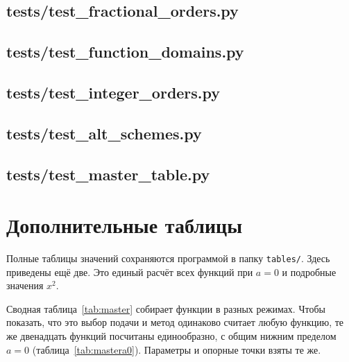 \documentclass[14pt,a4paper]{extarticle}
\begin{document}
\subsection{tests/test\_fractional\_orders.py}


\subsection{tests/test\_function\_domains.py}


\subsection{tests/test\_integer\_orders.py}


\subsection{tests/test\_alt\_schemes.py}


\subsection{tests/test\_master\_table.py}


\section{Дополнительные таблицы}

Полные таблицы значений сохраняются программой в папку \texttt{tables/}. Здесь приведены ещё две. Это единый расчёт всех функций при $a=0$ и подробные значения $x^2$.

Сводная таблица~\ref{tab:master} собирает функции в разных режимах. Чтобы показать, что это выбор подачи и метод одинаково считает любую функцию, те же двенадцать функций посчитаны единообразно, с общим нижним пределом $a=0$ (таблица~\ref{tab:mastera0}). Параметры и опорные точки взяты те же.
\end{document}
